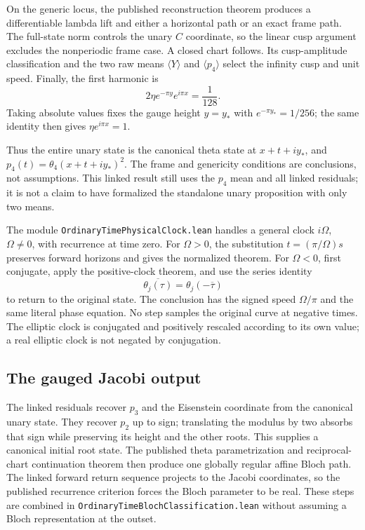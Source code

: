 \documentclass[11pt]{article}
\newcommand{\code}[1]{{\small\nolinkurl{#1}}}
\begin{document}
On the generic locus, the published reconstruction theorem produces a
differentiable lambda lift and either a horizontal path or an exact frame
path. The full-state norm controls the unary $C$ coordinate, so the linear
cusp argument excludes the nonperiodic frame case. A closed chart follows.
Its cusp-amplitude classification and the two raw means $\langle Y\rangle$
and $\langle p_4\rangle$ select the infinity cusp and unit speed. Finally,
the first harmonic is
\[
 2\eta e^{-\pi y}e^{i\pi x}=\frac1{128}.
\]
Taking absolute values fixes the gauge height $y=y_*$ with
$e^{-\pi y_*}=1/256$; the same identity then gives
$\eta e^{i\pi x}=1$.

Thus the entire unary state is the canonical theta state at
$x+t+iy_*$, and $p_4(t)=\theta_4(x+t+iy_*)^2$. The frame and genericity
conditions are conclusions, not assumptions. This linked result still
uses the $p_4$ mean and all linked residuals; it is not a claim to have
formalized the standalone unary proposition with only two means.

The module \code{OrdinaryTimePhysicalClock.lean} handles a general clock
$i\Omega$, $\Omega\ne0$, with recurrence at time zero. For $\Omega>0$,
the substitution $t=(\pi/\Omega)s$ preserves forward horizons and gives
the normalized theorem. For $\Omega<0$, first conjugate, apply the
positive-clock theorem, and use the series identity
\[
 \overline{\theta_j(\tau)}=\theta_j(-\overline\tau)
\]
to return to the original state. The conclusion has the signed speed
$\Omega/\pi$ and the same literal phase equation. No step samples the
original curve at negative times. The elliptic clock is conjugated and
positively rescaled according to its own value; a real elliptic clock is
not negated by conjugation.

\subsection{The gauged Jacobi output}

The linked residuals recover $p_3$ and the Eisenstein coordinate from the
canonical unary state. They recover $p_2$ up to sign; translating the
modulus by two absorbs that sign while preserving its height and the
other roots. This supplies a canonical initial root state. The published
theta parametrization and reciprocal-chart continuation theorem then
produce one globally regular affine Bloch path. The linked forward return
sequence projects to the Jacobi coordinates, so the published recurrence
criterion forces the Bloch parameter to be real. These steps are combined
in \code{OrdinaryTimeBlochClassification.lean} without assuming a Bloch
representation at the outset.
\end{document}
